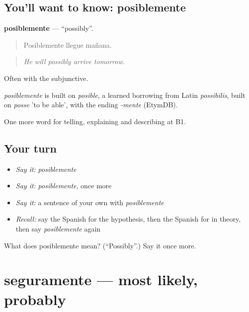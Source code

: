 \subsection*{You'll want to know: posiblemente}
\textbf{posiblemente} — \textquotedblleft{}possibly\textquotedblright{}.

\begin{quote}
Posiblemente llegue mañana.
\end{quote}

\begin{quote}
\emph{He will possibly arrive tomorrow.}
\end{quote}

Often with the subjunctive.

\begin{cousinweb}
\emph{posiblemente} is built on \emph{posible}, a learned borrowing from Latin \emph{possibilis}, built on \emph{posse} 'to be able', with the ending \emph{-mente} (EtymDB).
\end{cousinweb}

\begin{grammarlens}[title={What you've built}]
One more word for telling, explaining and describing at B1.
\end{grammarlens}

\subsection*{Your turn}
\begin{itemize}
\raggedright
  \item \emph{Say it:} \emph{posiblemente}
  \item \emph{Say it:} \emph{posiblemente}, once more
  \item \emph{Say it:} a sentence of your own with \emph{posiblemente}
  \item \emph{Recall:} say the Spanish for the hypothesis, then the Spanish for in theory, then say \emph{posiblemente} again
\end{itemize}

\begin{tcolorbox}[breakable,colback=teal!4,colframe=teal!35!black,title={Before you move on}]
What does posiblemente mean? (\textquotedblleft{}Possibly\textquotedblright{}.) Say it once more.
\end{tcolorbox}
\section[seguramente]{seguramente — most likely, probably}

